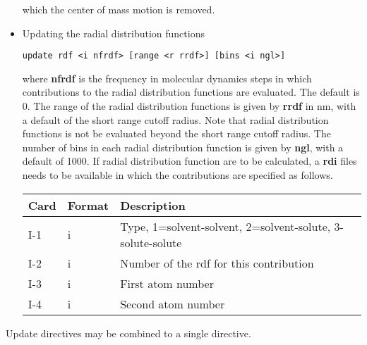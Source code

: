 \begin{itemize}
which the center of mass motion is removed.
\item
Updating the radial distribution functions
\begin{verbatim}
update rdf <i nfrdf> [range <r rrdf>] [bins <i ngl>]
\end{verbatim}
where {\bf nfrdf} is the frequency in molecular dynamics steps in 
which contributions to the radial distribution functions are
evaluated. The default is 0. The range of the radial distribution
functions is given by {\bf rrdf} in nm, with a default of the short
range cutoff radius. Note that radial distribution functions is not
be evaluated beyond the short range cutoff radius. The number of
bins in each radial distribution function is given by {\bf ngl}, with
a default of 1000.
If radial distribution function are to be
calculated, a {\bf rdi} files needs to be available in which the
contributions are specified as follows.
\begin{center}
\begin{tabular}{lll}
\hline\hline
Card & Format & Description \\ \hline
I-1  & i & Type, 1=solvent-solvent, 2=solvent-solute,
3-solute-solute\\
I-2  & i & Number of the rdf for this contribution\\
I-3  & i & First atom number \\
I-4  & i & Second atom number \\ 
\hline
\end{tabular}
\end{center}
\end{itemize}
Update directives may be combined to a single directive.
